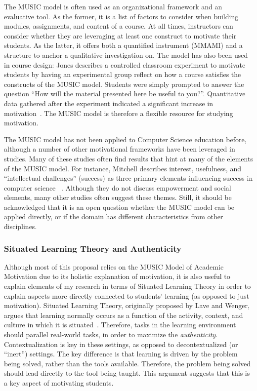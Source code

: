 The MUSIC model is often used as an organizational framework and an evaluative tool.
As the former, it is a list of factors to consider when building modules, assignments, and content of a course.
At all times, instructors can consider whether they are leveraging at least one construct to motivate their students.
As the latter, it offers both a quantified instrument (MMAMI) and a structure to anchor a qualitative investigation on.
The model has also been used in course design: Jones describes a controlled classroom experiment to motivate students by having an experimental group reflect on how a course satisfies the constructs of the MUSIC model. Students were simply prompted to answer the question ``How will the material presented here be useful to you?''.
Quantitative data gathered after the experiment indicated a significant increase in motivation~\cite{mcginley2014brief}.
The MUSIC model is therefore a flexible resource for studying motivation.

The MUSIC model has not been applied to Computer Science education before, although a number of other motivational frameworks have been leveraged in studies.
Many of these studies often find results that hint at many of the elements of the MUSIC model.
For instance, Mitchell describes interest, usefulness, and ``intellectual challenges'' (success) as three primary elements influencing success in computer science~\cite{Mitchell:2000} .
Although they do not discuss empowerment and social elements, many other studies often suggest these themes.
Still, it should be acknowledged that it is an open question whether the MUSIC model can be applied directly, or if the domain has different characteristics from other disciplines.

\subsubsection{Situated Learning Theory and Authenticity}

Although most of this proposal relies on the MUSIC Model of Academic Motivation due to its holistic explanation of motivation, it is also useful to explain elements of my research in terms of Situated Learning Theory in order to explain aspects more directly connected to students' learning (as opposed to just motivation).
Situated Learning Theory, originally proposed by Lave and Wenger, argues that learning normally occurs as a function of the activity, context, and culture in which it is situated~\cite{lave-situated}.
Therefore, tasks in the learning environment should parallel real-world tasks, in order to maximize the \textit{authenticity}.
Contextualization is key in these settings, as opposed to decontextualized (or ``inert'') settings.
The key difference is that learning is driven by the problem being solved, rather than the tools available. Therefore, the problem being solved should lead directly to the tool being taught.
This argument suggests that this is a key aspect of motivating students.

